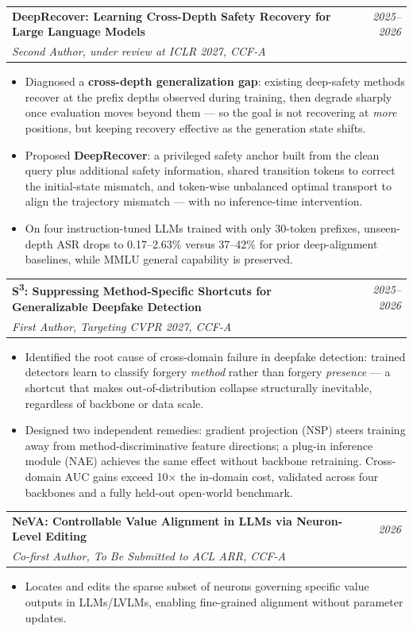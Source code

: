 \documentclass[a4paper,11pt]{article}
\makeatletter
\newcommand{\resumeProject}[4]{
\vspace{0.5mm}\item
    \begin{tabular*}{0.98\textwidth}[t]{l@{\extracolsep{\fill}}r}
        \textbf{#1} & \textit{\footnotesize{#3}} \\
        \footnotesize{\textit{#2}} & \footnotesize{#4}
    \end{tabular*}
    \vspace{-2.4mm}
}
\newcommand{\resumeItemListStart}{\begin{justify}\begin{itemize}[leftmargin=3ex, rightmargin=2ex, noitemsep,labelsep=1.2mm,itemsep=0mm]\small}
\newcommand{\resumeItemListEnd}{\end{itemize}\end{justify}\vspace{-2mm}}
\makeatother
\begin{document}
    \resumeProject
      {DeepRecover: Learning Cross-Depth Safety Recovery for Large Language Models}
      {Second Author, under review at ICLR 2027, CCF-A}
      {2025--2026}
      {}
    \resumeItemListStart
        \item {Diagnosed a \textbf{cross-depth generalization gap}: existing deep-safety
            methods recover at the prefix depths observed during training, then degrade sharply
            once evaluation moves beyond them --- so the goal is not recovering at \emph{more}
            positions, but keeping recovery effective as the generation state shifts.}
        \item {Proposed \textbf{DeepRecover}: a privileged safety anchor built from the clean
            query plus additional safety information, shared transition tokens to correct the
            initial-state mismatch, and token-wise unbalanced optimal transport to align the
            trajectory mismatch --- with no inference-time intervention.}
        \item {On four instruction-tuned LLMs trained with only 30-token prefixes, unseen-depth
            ASR drops to 0.17--2.63\% versus 37--42\% for prior deep-alignment baselines, while
            MMLU general capability is preserved.}
    \resumeItemListEnd

    \resumeProject
      {S\textsuperscript{3}: Suppressing Method-Specific Shortcuts for Generalizable Deepfake Detection}
      {First Author, Targeting CVPR 2027, CCF-A}
      {2025--2026}
      {}
    \resumeItemListStart
    \item {Identified the root cause of cross-domain failure in deepfake detection:
        trained detectors learn to classify forgery \textit{method} rather than
        forgery \textit{presence} — a shortcut that makes out-of-distribution
        collapse structurally inevitable, regardless of backbone or data scale.}
    \item {Designed two independent remedies: gradient projection (NSP) steers
        training away from method-discriminative feature directions; a plug-in
        inference module (NAE) achieves the same effect without backbone retraining.
        Cross-domain AUC gains exceed 10$\times$ the in-domain cost, validated
        across four backbones and a fully held-out open-world benchmark.}
    \resumeItemListEnd

    \resumeProject
      {NeVA: Controllable Value Alignment in LLMs via Neuron-Level Editing}
      {Co-first Author, To Be Submitted to ACL ARR, CCF-A}
      {2026}
      {}
      \resumeItemListStart
        \item {Locates and edits the sparse subset of neurons governing specific value outputs in LLMs/LVLMs, enabling fine-grained alignment without parameter updates.}
    \resumeItemListEnd
\end{document}
